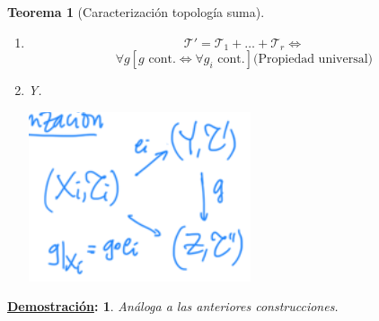 \documentclass[10pt,a4paper,openright]{book}
\theoremstyle{break}
\newtheorem*{theo}{Teorema}
\newtheorem*{demo}{\underline{Demostración}:}
\begin{document}
\begin{theo}[Caracterización topología suma]
\begin{enumerate}
    \item
    \[
    \mathcal{T}' = \mathcal{T}_1 + \ldots + \mathcal{T}_r \Leftrightarrow  
    \]
    \begin{equation}
        \forall g \left[ g \text{ cont.} \Leftrightarrow \forall g_i \text{ cont.} \right] \text{(Propiedad universal)} 
    \end{equation}

    \item Y.
    \begin{center}
        \includegraphics[scale=0.3]{images/caracterizacion_top_sum} 
    \end{center}
\end{enumerate}
\end{theo}
\begin{demo}
    Análoga a las anteriores construcciones.
\end{demo}
\end{document}
